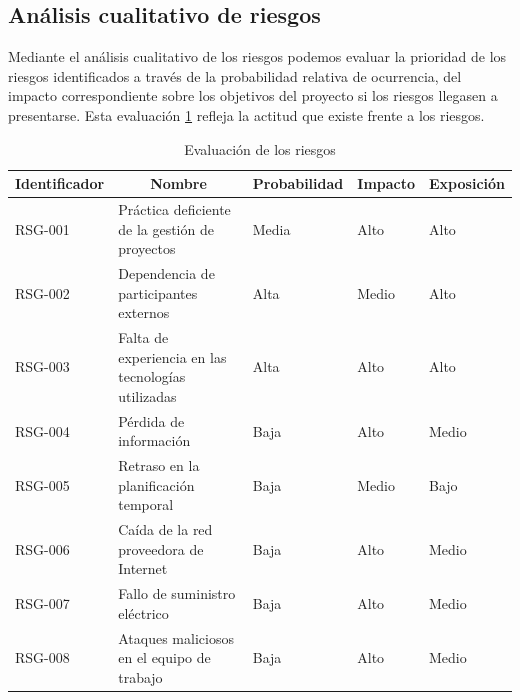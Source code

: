\subsection{Análisis cualitativo de riesgos}
Mediante el análisis cualitativo de los riesgos podemos evaluar la prioridad de los riesgos identificados a través de la probabilidad relativa de ocurrencia, del impacto correspondiente sobre los objetivos del proyecto si los riesgos llegasen a presentarse. Esta evaluación \ref{tab_eval_riesgos} refleja la actitud que existe frente a los riesgos. 

\begin{table}[htpb]
\centering
\caption{Evaluación de los riesgos}
\label{tab_eval_riesgos}
\begin{tabularx}{\textwidth}{|l|X|l|l|l|}
\hline
\multicolumn{1}{|c|}{Identificador} & \multicolumn{1}{c|}{Nombre}                        & \multicolumn{1}{c|}{Probabilidad} & \multicolumn{1}{c|}{Impacto} & \multicolumn{1}{c|}{Exposición} \\ \hline
RSG-001                             & Práctica deficiente de la gestión de proyectos     & Media                             & Alto                         & Alto                            \\ \hline
RSG-002                             & Dependencia de participantes externos              & Alta                              & Medio                        & Alto                            \\ \hline
RSG-003                             & Falta de experiencia en las tecnologías utilizadas & Alta                              & Alto                         & Alto                            \\ \hline
RSG-004                             & Pérdida de información                             & Baja                              & Alto                         & Medio                           \\ \hline
RSG-005                             & Retraso en la planificación temporal               & Baja                              & Medio                        & Bajo                            \\ \hline
RSG-006                             & Caída de la red proveedora de Internet             & Baja                              & Alto                         & Medio                           \\ \hline
RSG-007                             & Fallo de suministro eléctrico                      & Baja                              & Alto                         & Medio                           \\ \hline
RSG-008                             & Ataques maliciosos en el equipo de trabajo         & Baja                              & Alto                         & Medio                           \\ \hline
\end{tabularx}
\end{table}

